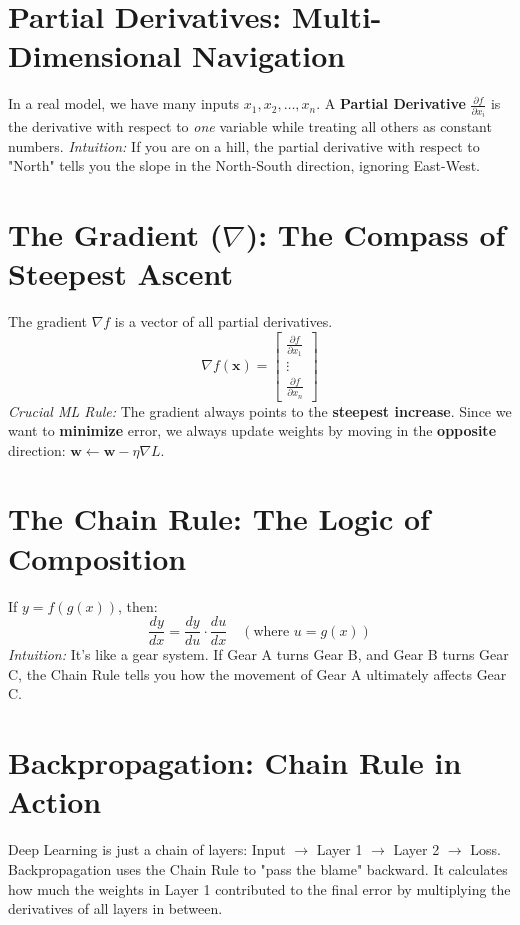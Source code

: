 \documentclass{article}
\begin{document}
\section{Partial Derivatives: Multi-Dimensional Navigation}
In a real model, we have many inputs $x_1, x_2, \dots, x_n$. 
A \textbf{Partial Derivative} $\frac{\partial f}{\partial x_i}$ is the derivative with respect to \textit{one} variable while treating all others as constant numbers.
\textit{Intuition:} If you are on a hill, the partial derivative with respect to "North" tells you the slope in the North-South direction, ignoring East-West.

\section{The Gradient ($\nabla$): The Compass of Steepest Ascent}
The gradient $\nabla f$ is a vector of all partial derivatives.
\begin{equation}
    \nabla f(\mathbf{x}) = \begin{bmatrix} \frac{\partial f}{\partial x_1} \\ \vdots \\ \frac{\partial f}{\partial x_n} \end{bmatrix}
\end{equation}
\textit{Crucial ML Rule:} The gradient always points to the \textbf{steepest increase}. Since we want to \textbf{minimize} error, we always update weights by moving in the \textbf{opposite} direction: $\mathbf{w} \leftarrow \mathbf{w} - \eta \nabla L$.

\section{The Chain Rule: The Logic of Composition}
If $y = f(g(x))$, then:
\begin{equation}
    \frac{dy}{dx} = \frac{dy}{du} \cdot \frac{du}{dx} \quad (\text{where } u = g(x))
\end{equation}
\textit{Intuition:} It's like a gear system. If Gear A turns Gear B, and Gear B turns Gear C, the Chain Rule tells you how the movement of Gear A ultimately affects Gear C.

\section{Backpropagation: Chain Rule in Action}
Deep Learning is just a chain of layers: Input $\to$ Layer 1 $\to$ Layer 2 $\to$ Loss.
Backpropagation uses the Chain Rule to "pass the blame" backward. It calculates how much the weights in Layer 1 contributed to the final error by multiplying the derivatives of all layers in between.
\end{document}
